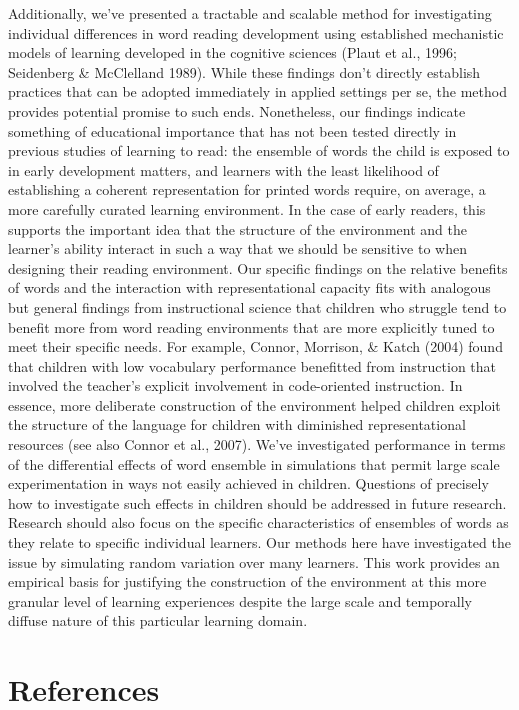 \documentclass[
  ,man,floatsintext]{apa6}
\begin{document}
Additionally, we've presented a tractable and scalable method for investigating individual differences in word reading development using established mechanistic models of learning developed in the cognitive sciences (Plaut et al., 1996; Seidenberg \& McClelland 1989). While these findings don't directly establish practices that can be adopted immediately in applied settings per se, the method provides potential promise to such ends. Nonetheless, our findings indicate something of educational importance that has not been tested directly in previous studies of learning to read: the ensemble of words the child is exposed to in early development matters, and learners with the least likelihood of establishing a coherent representation for printed words require, on average, a more carefully curated learning environment. In the case of early readers, this supports the important idea that the structure of the environment and the learner's ability interact in such a way that we should be sensitive to when designing their reading environment. Our specific findings on the relative benefits of words and the interaction with representational capacity fits with analogous but general findings from instructional science that children who struggle tend to benefit more from word reading environments that are more explicitly tuned to meet their specific needs. For example, Connor, Morrison, \& Katch (2004) found that children with low vocabulary performance benefitted from instruction that involved the teacher's explicit involvement in code-oriented instruction. In essence, more deliberate construction of the environment helped children exploit the structure of the language for children with diminished representational resources (see also Connor et al., 2007). We've investigated performance in terms of the differential effects of word ensemble in simulations that permit large scale experimentation in ways not easily achieved in children. Questions of precisely how to investigate such effects in children should be addressed in future research. Research should also focus on the specific characteristics of ensembles of words as they relate to specific individual learners. Our methods here have investigated the issue by simulating random variation over many learners. This work provides an empirical basis for justifying the construction of the environment at this more granular level of learning experiences despite the large scale and temporally diffuse nature of this particular learning domain.

\hypertarget{references}{%
\section{References}\label{references}}
\end{document}
